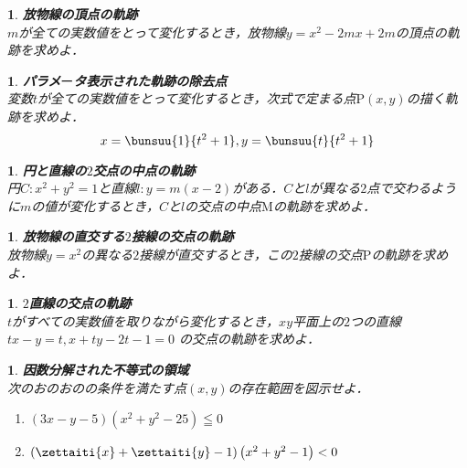 \documentclass[10pt,
fleqn,
dvipdfmx,
uplatex
]{jsarticle}
\newtheorem{question}[Question]{}
\begin{document}
\begin{question}{\bf\boldmath 放物線の頂点の軌跡}\\
$m$が全ての実数値をとって変化するとき，放物線$y=x^2-2mx+2m$の頂点の軌跡を求めよ．
\end{question}



\begin{question}{\bf\boldmath パラメ$ー$タ表示された軌跡の除去点}\\
変数$t$が全ての実数値をとって変化するとき，次式で定まる点$\text{P}\left(x,y\right)$の描く軌跡を求めよ．
\[x=\bunsuu{1}{{}t^2+1}, y=\bunsuu{t}{{}t^2+1}\]
\end{question}



\begin{question}{\bf\boldmath 円と直線の$2$交点の中点の軌跡}\\
円$C:x^2+y^2=1$と直線$l:y=m\left(x-2\right)$がある．$C$と$l$が異なる$2$点で交わるように$m$の値が変化するとき，$C$と$l$の交点の中点$\text{M}$の軌跡を求めよ．
\end{question}



\begin{question}{\bf\boldmath 放物線の直交する$2$接線の交点の軌跡}\\
放物線$y=x^2$の異なる$2$接線が直交するとき，この$2$接線の交点$\text{P}$の軌跡を求めよ．
\end{question}



\begin{question}{\bf\boldmath $2$直線の交点の軌跡}\\
$t$がすべての実数値を取りながら変化するとき，$xy$平面上の$2$つの直線$tx-y=t, x+ty-2t-1=0$
の交点の軌跡を求めよ．
\end{question}



\begin{question}{\bf\boldmath 因数分解された不等式の領域}\\
次のおのおのの条件を満たす点$\left(x,y\right)$の存在範囲を図示せよ．
\begin{enumerate}
\item $\left(3x-y-5\right)\left(x^2+y^2-{25}\right)\leqq 0$
\item $\left(\zettaiti{x}+\zettaiti{y}-1\right)\left(x^2+y^2-1\right)<0$
\end{enumerate}

\end{question}
\end{document}
